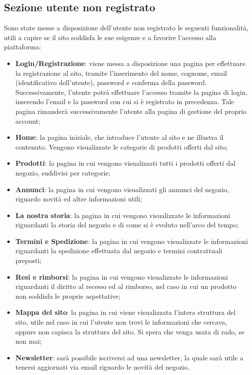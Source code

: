 	\subsection{Sezione utente non registrato}
	Sono state messe a disposizione dell'utente non registrato le seguenti funzionalità, utili a capire se il sito soddisfa le sue esigenze e a favorire l'accesso alla piattaforma:
	\begin{itemize}
		\item \textbf{Login/Registrazione}: viene messa a disposizione una pagina per effettuare la registrazione al sito, tramite l'inserimento del nome, cognome, email (identificativo dell'utente), password e conferma della password. Successivamente, l'utente potrà effettuare l'accesso tramite la pagina di login, inserendo l'email e la password con cui si è registrato in precedenza. Tale pagina rimanderà successivamente l'utente alla pagina di gestione del proprio account;
		\item \textbf{Home}: la pagina iniziale, che introduce l'utente al sito e ne illustra il contenuto. Vengono visualizzate le categorie di prodotti offerti dal sito;
		\item \textbf{Prodotti}: la pagina in cui vengono visualizzati tutti i prodotti offerti dal negozio, suddivisi per categorie;
		\item \textbf{Annunci}: la pagina in cui vengono visualizzati gli annunci del negozio, riguardo novità ed altre informazioni utili;
		\item \textbf{La nostra storia}: la pagina in cui vengono visualizzate le informazioni riguardanti la storia del negozio e di come si è evoluto nell'arco del tempo;
		\item \textbf{Termini e Spedizione}: la pagina in cui vengono visualizzate le informazioni riguardanti la spedizione effettuata dal negozio e termini contrattuali preposti;
		\item \textbf{Resi e rimborsi}: la pagina in cui vengono visualizzate le informazioni riguardanti il diritto al recesso ed al rimborso, nel caso in cui un prodotto non soddisfa le proprie aspettative;
		\item \textbf{Mappa del sito}: la pagina in cui viene visualizzata l'intera struttura del sito, utile nel caso in cui l'utente non trovi le informazioni che cercava, oppure non capisca la struttura del sito. Si spera che venga usata di rado, se non mai;
		\item \textbf{Newsletter}: sarà possibile iscriversi ad una newsletter, la quale sarà utile a tenersi aggiornati via email riguardo le novità del negozio.
	\end{itemize}
